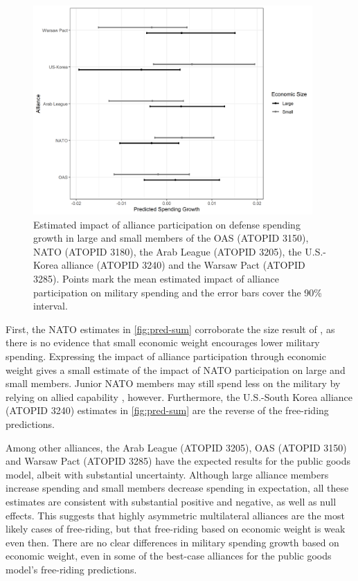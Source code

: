 \documentclass[12pt]{article}
\begin{document}
\begin{figure}[htbp]
	\centering
		\includegraphics[width=0.95\textwidth]{pred-sum.png}
	\caption{Estimated impact of alliance participation on defense spending growth in large and small members of the OAS (ATOPID 3150), NATO (ATOPID 3180), the Arab League (ATOPID 3205), the U.S.-Korea alliance (ATOPID 3240) and the Warsaw Pact (ATOPID 3285). Points mark the mean estimated impact of alliance participation on military spending and the error bars cover the 90\% interval.}
	\label{fig:pred-sum}
\end{figure}


First, the NATO estimates in \autoref{fig:pred-sum} corroborate the size result of \citet{PluemperNeumayer2015}, as there is no evidence that small economic weight encourages lower military spending.
Expressing the impact of alliance participation through economic weight gives a small estimate of the impact of NATO participation on large and small members.  
Junior NATO members may still spend less on the military by relying on allied capability \citep{GeorgeSandler2017}, however. 
Furthermore, the U.S.-South Korea alliance (ATOPID 3240) estimates in \autoref{fig:pred-sum} are the reverse of the free-riding predictions. 


Among other alliances, the Arab League (ATOPID 3205), OAS (ATOPID 3150) and Warsaw Pact (ATOPID 3285) have the expected results for the public goods model, albeit with substantial uncertainty.
Although large alliance members increase spending and small members decrease spending in expectation, all these estimates are consistent with substantial positive and negative, as well as null effects. 
This suggests that highly asymmetric multilateral alliances are the most likely cases of free-riding, but that free-riding based on economic weight is weak even then.
There are no clear differences in military spending growth based on economic weight, even in some of the best-case alliances for the public goods model's free-riding predictions. 
\end{document}

